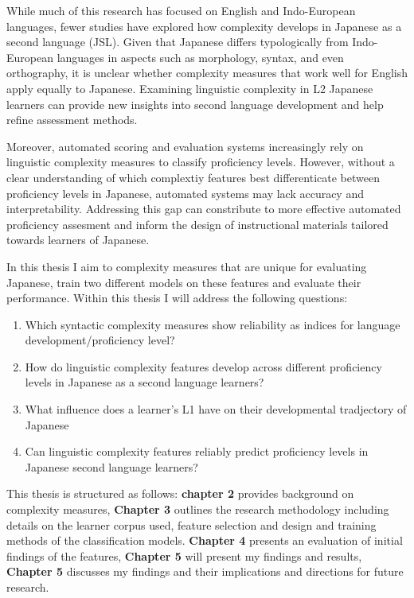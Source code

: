 While much of this research has focused on English and Indo-European languages, fewer studies have explored how
complexity develops in Japanese as a second language (JSL). Given that Japanese differs typologically from
Indo-European languages in aspects such as morphology, syntax, and even orthography, it is unclear whether
complexity measures that work well for English apply equally to Japanese. Examining linguistic complexity in L2
Japanese learners can provide new insights into second language development and help refine assessment methods.

Moreover, automated scoring and evaluation systems increasingly rely on linguistic complexity measures to classify
proficiency levels. However, without a clear understanding of which complextiy features best differenticate between
proficiency levels in Japanese, automated systems may lack accuracy and interpretability. Addressing this gap can
constribute to more effective automated proficiency assesment and inform the design of instructional materials
tailored towards learners of Japanese.


In this thesis I aim to complexity measures that are unique for evaluating Japanese, train two different models on
these features and evaluate their performance. Within this thesis I will address the following questions:
\begin{enumerate}
    \item Which syntactic complexity measures show reliability as indices for language development/proficiency level?
    \item How do linguistic complexity features develop across different proficiency levels in Japanese as a second language learners?
    \item What influence does a learner's L1 have on their developmental tradjectory of Japanese
    \item Can linguistic complexity features reliably predict proficiency levels in Japanese second language learners?
\end{enumerate}

This thesis is structured as follows: \textbf{chapter 2} provides background on complexity measures, \textbf{Chapter 3} outlines the research methodology including details on the learner corpus used, feature selection and design and training methods of the
classification models. \textbf{Chapter 4} presents an evaluation of initial findings of the features,
\textbf{Chapter 5 }will present my findings and results, \textbf{Chapter 5} discusses my
findings and their implications and directions for future research.